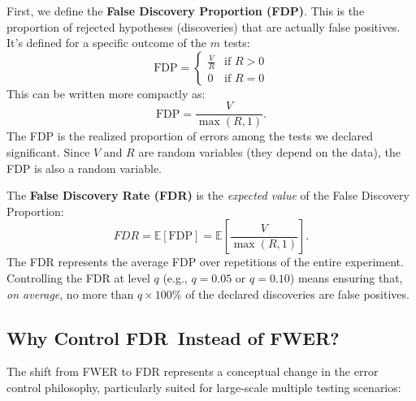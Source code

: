 \documentclass[12pt]{book}
\newcommand{\E}{\mathbb{E}}              %
\newcommand{\FDR}{{FDR}}    %
\newcommand{\FWER}{{FWER}}  %
\begin{document}
First, we define the \textbf{False Discovery Proportion (FDP)}. This is the proportion of rejected hypotheses (discoveries) that are actually false positives. It's defined for a specific outcome of the $m$ tests:
\begin{equation}
  \text{FDP} = \begin{cases} \frac{V}{R} & \text{if } R > 0 \\ 0 & \text{if } R = 0 \end{cases}
  \label{eq:fdp_def}
\end{equation}
This can be written more compactly as:
\begin{equation}
  \text{FDP} = \frac{V}{\max(R,1)}. \label{eq:fdp}
\end{equation}
The FDP is the realized proportion of errors among the tests we declared significant. Since $V$ and $R$ are random variables (they depend on the data), the FDP is also a random variable.

The \textbf{False Discovery Rate (FDR)} is the \emph{expected value} of the False Discovery Proportion:
\begin{equation}
  \FDR = \E[\text{FDP}] = \E\left[ \frac{V}{\max(R,1)} \right]. \label{eq:fdr}
\end{equation}
The FDR represents the average FDP over repetitions of the entire experiment. Controlling the FDR at level $q$ (e.g., $q=0.05$ or $q=0.10$) means ensuring that, \emph{on average}, no more than $q \times 100\%$ of the declared discoveries are false positives.

\subsection{Why Control \FDR\ Instead of \FWER?}
The shift from FWER to FDR represents a conceptual change in the error control philosophy, particularly suited for large-scale multiple testing scenarios:
\end{document}
